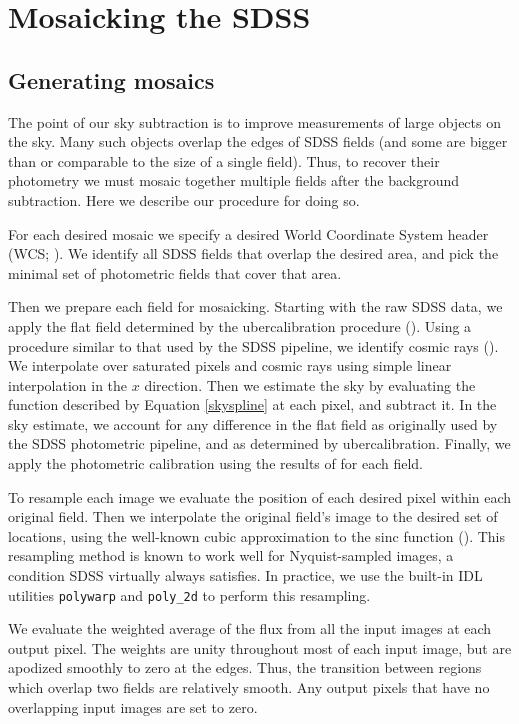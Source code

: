 \documentclass[10pt,preprint]{aastex}
\begin{document}
\section{Mosaicking the SDSS}
\label{sec:mosaic}

\subsection{Generating mosaics}

The point of our sky subtraction is to improve measurements of large
objects on the sky.  Many such objects overlap the edges of SDSS
fields (and some are bigger than or comparable to the size of a single
field).  Thus, to recover their photometry we must mosaic together
multiple fields after the background subtraction. Here we describe our
procedure for doing so. 

For each desired mosaic we specify a desired World Coordinate System
header (WCS; \citealt{greisen02a}). We identify all SDSS fields that
overlap the desired area, and pick the minimal set of photometric
fields that cover that area.

Then we prepare each field for mosaicking.  Starting with the raw SDSS
data, we apply the flat field determined by the ubercalibration
procedure (\citealt{padmanabhan07b}). Using a procedure similar to
that used by the SDSS pipeline, we identify cosmic rays
(\citealt{lupton01a}). We interpolate over saturated pixels and cosmic
rays using simple linear interpolation in the $x$ direction.  Then we
estimate the sky by evaluating the function described by Equation
\ref{skyspline} at each pixel, and subtract it. In the sky estimate,
we account for any difference in the flat field as originally used by
the SDSS photometric pipeline, and as determined by
ubercalibration. Finally, we apply the photometric calibration using
the results of \citet{padmanabhan07b} for each field.

To resample each image we evaluate the position of each desired pixel
within each original field. Then we interpolate the original field's
image to the desired set of locations, using the well-known cubic
approximation to the sinc function (\citealt{park83a}). This
resampling method is known to work well for Nyquist-sampled images, a
condition SDSS virtually always satisfies. In practice, we use the
built-in IDL utilities {\tt polywarp} and {\tt poly\_2d} to perform
this resampling.

We evaluate the weighted average of the flux from all the input images
at each output pixel. The weights are unity throughout most of each
input image, but are apodized smoothly to zero at the edges. Thus, the
transition between regions which overlap two fields are relatively
smooth. Any output pixels that have no overlapping input images are
set to zero.
\end{document}
